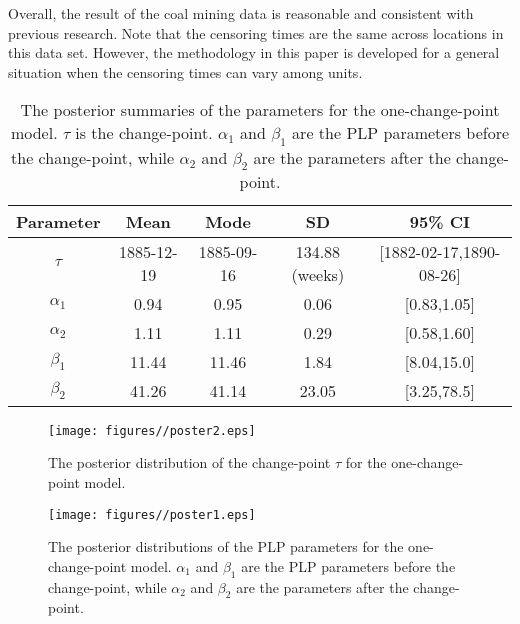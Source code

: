 \documentclass[12pt]{article}
\numberwithin{equation}{section}
\begin{document}
Overall, the result of the coal mining data is reasonable and consistent with previous research. Note that the censoring times are the same across locations in this data set. However, the methodology in this paper is developed for a general situation when the censoring times can vary among units.
\begin{table}[htbp] 
	\centering
	\caption{The posterior summaries of the parameters for the one-change-point model. $\tau$ is the change-point.  $\alpha_1$ and $\beta_1$ are 
			the PLP parameters before the change-point, while $\alpha_2$ and $\beta_2$ are the parameters after the change-point.}
	\begin{tabular}{ccccc}
		\hline
		Parameter & Mean & Mode & SD & 95\% CI \\
		\hline
		$\tau$   & 1885-12-19 & 1885-09-16 & 134.88 (weeks) & [1882-02-17,1890-08-26] \\
		$\alpha_1$ & 0.94	& 0.95 &	0.06  & [0.83,1.05] \\
		$\alpha_2$ & 1.11	& 1.11	& 0.29  & [0.58,1.60] \\
		$\beta_1$ & 11.44	& 11.46 &	1.84 & [8.04,15.0] \\
	$	\beta_2$ & 41.26	& 41.14 &	23.05 & [3.25,78.5] \\
		\hline
	\end{tabular}%
	\label{tab:esti}%
\end{table}%
 \begin{figure}
  
   \centering
     \texttt{[image: figures//poster2.eps]}    
      \caption{The posterior distribution of the change-point $\tau$ for the one-change-point model.}
      \label{fig:poster2}
 \end{figure}
  \begin{figure}

    \centering
      \texttt{[image: figures//poster1.eps]}
          \caption{The posterior distributions of the PLP parameters for the one-change-point model. $\alpha_1$ and $\beta_1$ are 
          			the PLP parameters before the change-point, while $\alpha_2$ and $\beta_2$ are the parameters after the change-point.}
          			\label{fig:poster1}
  \end{figure}
%  
 
\end{document}
